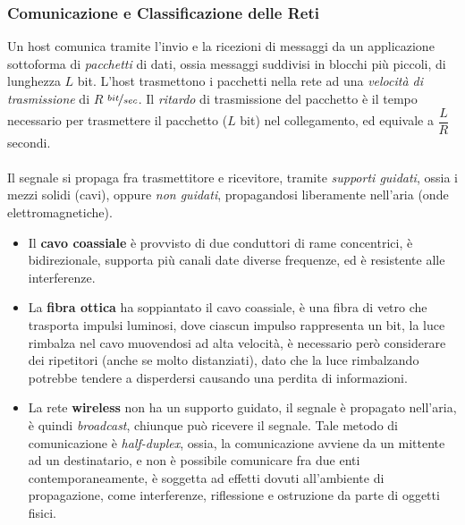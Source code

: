 \documentclass[12pt, letterpaper]{article}
\newcommand{\acc}{\\\hphantom{}\\}
\begin{document}
\subsubsection{Comunicazione e Classificazione delle Reti}
Un host comunica tramite l'invio e la ricezioni di messaggi da un applicazione sottoforma di \textit{pacchetti} di dati, ossia
messaggi suddivisi in blocchi più piccoli, di lunghezza $L$ bit. L'host trasmettono i pacchetti nella rete
ad una \textit{velocità di trasmissione} di $R$ $\nicefrac{bit}{sec}$. Il \textit{ritardo} di trasmissione del pacchetto è
il tempo necessario per trasmettere il pacchetto ($L$ bit) nel collegamento, ed equivale a $\dfrac{L}{R}$ secondi.\acc
Il segnale si propaga fra trasmettitore e ricevitore, tramite \textit{supporti guidati}, ossia i mezzi solidi (cavi), oppure
\textit{non guidati}, propagandosi liberamente nell'aria (onde elettromagnetiche).\begin{itemize}
    \item Il \textbf{cavo coassiale} è provvisto di due conduttori di rame concentrici, è bidirezionale, supporta più canali
          date diverse frequenze, ed è resistente alle interferenze.
    \item La \textbf{fibra ottica} ha soppiantato il cavo coassiale, è una fibra di vetro che trasporta impulsi luminosi, dove ciascun
          impulso rappresenta un bit, la luce rimbalza nel cavo muovendosi ad alta velocità, è necessario però considerare dei
          ripetitori (anche se molto distanziati), dato che la luce rimbalzando potrebbe tendere a disperdersi causando una perdita
          di informazioni.
    \item La rete \textbf{wireless} non ha un supporto guidato, il segnale è propagato nell'aria, è quindi \textit{broadcast},
          chiunque può ricevere il segnale. Tale metodo di comunicazione è \textit{half-duplex}, ossia, la comunicazione avviene da un
          mittente ad un destinatario, e non è possibile comunicare fra due enti contemporaneamente, è soggetta ad effetti dovuti all'ambiente
          di propagazione, come interferenze, riflessione e ostruzione da parte di oggetti fisici.
\end{itemize}
\end{document}
